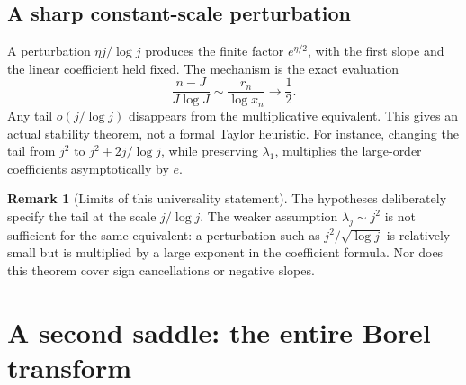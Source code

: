 \documentclass[11pt,a4paper]{article}
\theoremstyle{definition}
\newtheorem{remark}[theorem]{Remark}
\numberwithin{equation}{section}
\begin{document}
\subsection{A sharp constant-scale perturbation}
A perturbation \(\eta j/\log j\) produces the finite factor
\(e^{\eta/2}\), with the first slope and the linear coefficient held
fixed. The mechanism is the exact evaluation
\[
 \frac{n-J}{J\log J}\sim\frac{r_n}{\log x_n}\longrightarrow\frac12.
\]
Any tail \(o(j/\log j)\) disappears from the multiplicative equivalent.
This gives an actual stability theorem, not a formal Taylor heuristic.
For instance, changing the tail from \(j^2\) to
\(j^2+2j/\log j\), while preserving \(\lambda_1\), multiplies the
large-order coefficients asymptotically by \(e\).

\begin{remark}[Limits of this universality statement]
The hypotheses deliberately specify the tail at the scale \(j/\log j\).
The weaker assumption \(\lambda_j\sim j^2\) is not sufficient for the
same equivalent: a perturbation such as \(j^2/\sqrt{\log j}\) is
relatively small but is multiplied by a large exponent in the coefficient
formula. Nor does this theorem cover sign cancellations or negative slopes.
\end{remark}

\section{A second saddle: the entire Borel transform}
\label{sec:borel-proof}
\end{document}
